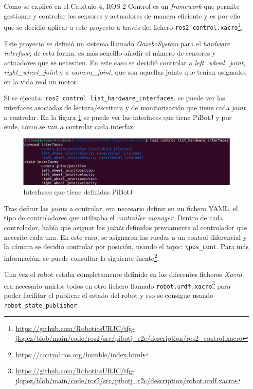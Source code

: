 Como se explicó en el Capítulo 4, ROS 2 Control es un \textit{framework} que permite gestionar y controlar los sensores y actuadores de manera eficiente y es por ello que se decidió aplicar a este proyecto a través del fichero \verb|ros2_control.xacro|\footnote{\url{https://github.com/RoboticsURJC/tfg-jlopez/blob/main/code/ros2/src/pibotj_r2c/description/ros2_control.xacro}}.

Este proyecto se definió un sistema llamado \textit{GazeboSystem} para el \textit{hardware interface}; de esta forma, es más sencillo añadir el número de sensores y actuadores que se necesiten. En este caso se decidió controlar a \textit{left\_wheel\_joint}, \textit{right\_wheel\_joint} y a \textit{camera\_joint}, que son aquellas joints que tenían asignados en la vida real un motor. 

Si se ejecuta: \verb|ros2 control list_hardware_interfaces|, se puede ver las interfaces asociadas de lectura/escritura y de monitorización que tiene cada \textit{joint} a controlar. En la figura \ref{fig:ros2control} se puede ver las interfaces que tiene PiBotJ y por ende, cómo se van a controlar cada interfaz.

 \begin{figure} [h!]
 	\begin{center}
 		\includegraphics[width=14cm]{figs/cap6/interfaces.png}
 	\end{center}
 	\caption{Interfaces que tiene definidas PiBotJ}
 	\label{fig:ros2control}
 \end{figure}

Tras definir las \textit{joints} a controlar, era necesario definir en un fichero YAML, el tipo de controladores que utilizaba el \textit{controller manager}. Dentro de cada controlador, había que asignar las \textit{joints} definidas previamente al controlador que necesite cada una. En este caso, se asignaron las ruedas a un control diferencial y la cámara se decidió controlar por posición, usando el topic: \verb|\pos_cont|. Para más información, se puede consultar la siguiente fuente\footnote{\url{https://control.ros.org/humble/index.html}}.

Una vez el robot estaba completamente definido en los diferentes ficheros \textit{Xacro}, era necesario unirlos todos en otro fichero llamado \verb|robot.urdf.xacro|\footnote{\url{https://github.com/RoboticsURJC/tfg-jlopez/blob/main/code/ros2/src/pibotj_r2c/description/robot.urdf.xacro}} para poder facilitar el publicar el estado del robot y eso se consigue usando \verb|robot_state_publisher|.
 
